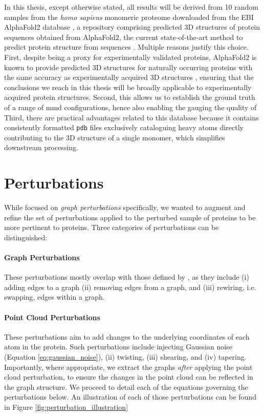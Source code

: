 In this thesis, except otherwise stated, all results will be derived from 10
random samples from the \textit{homo sapiens} monomeric proteome downloaded from
the EBI AlphaFold2 database
\citep{varadi2022alphafold,tunyasuvunakool2021highly}, a repository comprising
predicted 3D structures of protein sequences obtained from AlphaFold2, the
current state-of-the-art method to predict protein structure from sequences
\citep{jumper2021highly}. Multiple reasons justify this choice. First, despite
being a proxy for experimentally validated proteins, AlphaFold2 is known to
provide predicted 3D structures for naturally occurring proteins with the same
accuracy as experimentally acquired 3D structures \citep{jumper2021highly},
ensuring that the conclusions we reach in this thesis will be broadly applicable
to experimentally acquired protein structures. Second, this allows us to
establish the ground truth of a range of \gls{mmd} configurations, hence
also enabling the gauging the quality of Third, there are practical advantages
related to this database because it contains consistently formatted \texttt{pdb}
files exclusively cataloguing heavy atoms directly contributing to the 3D
structure of a single monomer, which simplifies downstream processing.

\section{Perturbations}

While \cite{obray2022evaluation} focused on \emph{graph perturbations} specifically,
we wanted to augment and refine the set of perturbations applied to the perturbed
sample of proteins to be more pertinent to proteins. Three
categories of perturbations can be distinguished:

\paragraph{Graph Perturbations} These perturbations mostly overlap with those
defined by \cite{obray2022evaluation}, as they include (i) adding edges to a graph
(ii) removing edges from a graph, and (iii) rewiring, i.e. swapping, edges within a
graph.
\paragraph{Point Cloud Perturbations} These perturbations aim to add changes
to the underlying coordinates of each atom in the protein. Such
perturbations include injecting Gaussian noise (Equation
\ref{eq:gaussian_noise}), (ii) twisting, (iii) shearing, and
(iv) tapering. Importantly, where appropriate, we extract the graphs \emph{after} applying the
point cloud perturbation, to ensure the changes in the point cloud can be
reflected in the graph structure. We proceed to detail each of the equations governing the
perturbations below. An illustration of each of those perturbations can be found
in Figure \ref{fig:perturbation_illustration}


